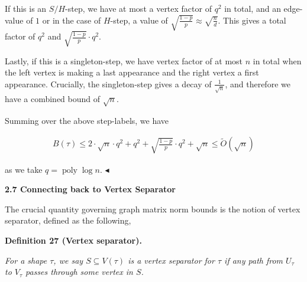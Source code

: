 If this is an $S/H$-step, we have at most a vertex factor of $q^{2}$ in total, and an edge-value of $1$ or in the case of $H$-step, a value of $\sqrt{\frac{1-p}{p}}\approx\sqrt{\frac{n}{d}}$. This gives a total factor of $q^{2}$ and $\sqrt{\frac{1-p}{p}}\cdot q^{2}$.\par




Lastly, if this is a singleton-step, we have vertex factor of at most $n$ in total when the left vertex is making a last appearance and the right vertex a first appearance. Crucially, the singleton-step gives a decay of $\frac{1}{\sqrt{n}}$, and therefore we have a combined bound of $\sqrt{n}$.\par




Summing over the above step-labels, we have\par


\[\begin{gathered}
B(\tau)\leq 2\cdot\sqrt{n}\cdot q^{2}+q^{2}+\sqrt{\frac{1-p}{p}}\cdot q^{2}+\sqrt{n}\leq\tilde{O}(\sqrt{n})
\end{gathered}\]


as we take $q=\operatorname{poly}\log n$.
$\blacktriangleleft$\par






\par\medskip\noindent\textbf{
2.7 Connecting back to Vertex Separator}\par




The crucial quantity governing graph matrix norm bounds is the notion of vertex separator, defined as the following,\par





\par\medskip\noindent\textbf{
\textbf{Definition 27}\textbf{ }(Vertex separator)\textbf{.}
}\par



\emph{For a shape $\tau$, we say $S\subseteq V(\tau)$ is a vertex separator for $\tau$ if any path from $U_{\tau}$ to $V_{\tau}$ passes through some vertex in $S$.}\par






